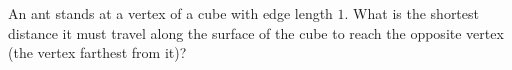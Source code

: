 An ant stands at a vertex of a cube with edge length $1$. What is the shortest distance it must travel along the surface of the cube to reach the opposite vertex (the vertex farthest from it)?
